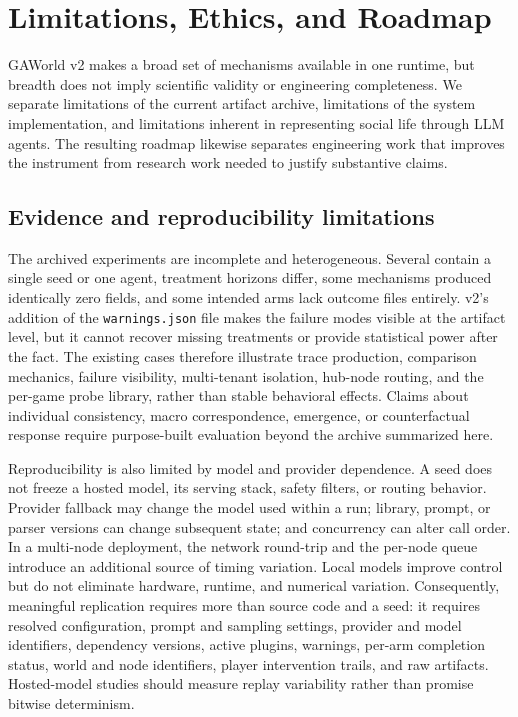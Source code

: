 \section{Limitations, Ethics, and Roadmap}
\label{sec:limitations-ethics-roadmap}

GAWorld v2 makes a broad set of mechanisms available in one runtime, but
breadth does not imply scientific validity or engineering completeness.
We separate limitations of the current artifact archive, limitations of
the system implementation, and limitations inherent in representing
social life through LLM agents.  The resulting roadmap likewise
separates engineering work that improves the instrument from research
work needed to justify substantive claims.

\subsection{Evidence and reproducibility limitations}

The archived experiments are incomplete and heterogeneous.  Several
contain a single seed or one agent, treatment horizons differ, some
mechanisms produced identically zero fields, and some intended arms
lack outcome files entirely.  v2's addition of the
\texttt{warnings.json} file makes the failure modes visible at the
artifact level, but it cannot recover missing treatments or provide
statistical power after the fact.  The existing cases therefore
illustrate trace production, comparison mechanics, failure visibility,
multi-tenant isolation, hub-node routing, and the per-game probe
library, rather than stable behavioral effects.  Claims about
individual consistency, macro correspondence, emergence, or
counterfactual response require purpose-built evaluation beyond the
archive summarized here.

Reproducibility is also limited by model and provider dependence.  A
seed does not freeze a hosted model, its serving stack, safety filters,
or routing behavior.  Provider fallback may change the model used
within a run; library, prompt, or parser versions can change subsequent
state; and concurrency can alter call order.  In a multi-node
deployment, the network round-trip and the per-node queue introduce an
additional source of timing variation.  Local models improve control but
do not eliminate hardware, runtime, and numerical variation.
Consequently, meaningful replication requires more than source code and
a seed: it requires resolved configuration, prompt and sampling
settings, provider and model identifiers, dependency versions, active
plugins, warnings, per-arm completion status, world and node
identifiers, player intervention trails, and raw artifacts.
Hosted-model studies should measure replay variability rather than
promise bitwise determinism.


